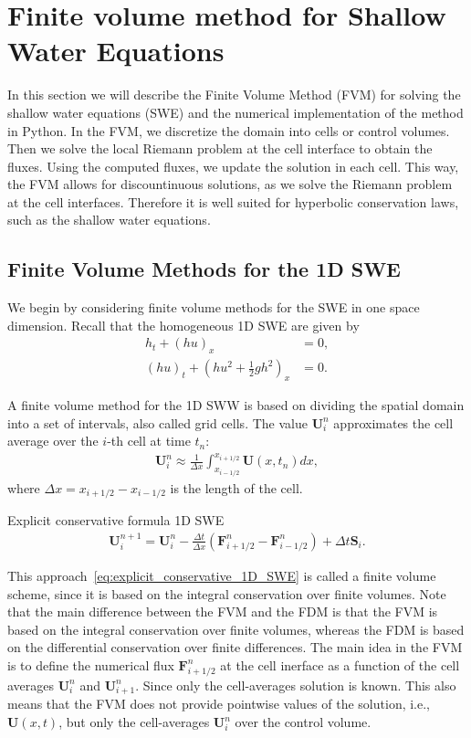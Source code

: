 \section{Finite volume method for Shallow Water Equations}
In this section we will describe the Finite Volume Method (FVM) for solving the shallow water equations (SWE) and the numerical implementation of the method in Python.
In the FVM, we discretize the domain into cells or control volumes.
Then we solve the local Riemann problem at the cell interface to obtain the fluxes.
Using the computed fluxes, we update the solution in each cell.
This way, the FVM allows for discountinuous solutions, as we solve the Riemann problem at the cell interfaces.
Therefore it is well suited for hyperbolic conservation laws, such as the shallow water equations.


\subsection{Finite Volume Methods for the 1D SWE}
We begin by considering finite volume methods for the SWE in one space dimension.
Recall that the homogeneous 1D SWE are given by
\begin{align*}
    h_t + {(hu)}_x &= 0, \\
    {(hu)}_t + {\left(hu^2 + \frac{1}{2}gh^2\right)}_x &= 0.
\end{align*}

A finite volume method for the 1D SWW is based on dividing the spatial domain into a set of intervals, also called grid cells.
The value $\mathbf{U}_i^n$ approximates the cell average over the $i$-th cell at time $t_n$:
\begin{align}
    \mathbf{U}_i^n \approx \frac{1}{\Delta x} \int_{x_{i-1/2}}^{x_{i+1/2}} \mathbf{U}(x,t_n) dx,
\end{align}
where $\Delta x = x_{i+1/2} - x_{i-1/2}$ is the length of the cell.



Explicit conservative formula 1D SWE
\begin{align}\label{eq:explicit_conservative_1D_SWE}
    \mathbf{U}_i^{n+1} = \mathbf{U}_i^n - \frac{\Delta t}{\Delta x} \left( \mathbf{F}_{i+1/2}^n - \mathbf{F}_{i-1/2}^n \right) + \Delta t \mathbf{S}_i.
\end{align}

This approach~\eqref{eq:explicit_conservative_1D_SWE} is called a finite volume scheme, since it is based on the integral conservation over finite volumes.
Note that the main difference between the FVM and the FDM is that the FVM is based on the integral conservation over finite volumes, whereas the FDM is based on the differential conservation over finite differences.
The main idea in the FVM is to define the numerical flux $\mathbf{F}_{i+1/2}^n$ at the cell inerface as a function of the cell averages $\mathbf{U}_i^n$ and $\mathbf{U}_{i+1}^n$.
Since only the cell-averages solution is known.
This also means that the FVM does not provide pointwise values of the solution, i.e., $\mathbf{U}(x,t)$, but only the cell-averages $\mathbf{U}_i^n$ over the control volume.

